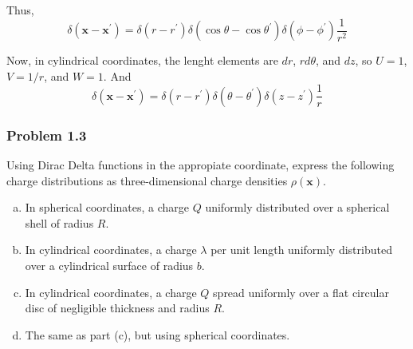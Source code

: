 Thus,
$$
\delta\left(\mathbf{x}-\mathbf{x}^\prime\right) =
\delta(r-r^\prime) \delta(\cos\theta-\cos\theta^\prime) \delta(\phi-\phi^\prime) \frac{1}{r^2}
$$

Now, in cylindrical coordinates, the lenght elements are $dr$, $rd\theta$, and $dz$, so
$U=1$, $V=1/r$, and $W=1$.
And
$$
\delta\left(\mathbf{x}-\mathbf{x}^\prime\right) =
\delta(r-r^\prime) \delta(\theta-\theta^\prime) \delta(z-z^\prime) \frac{1}{r}
$$


\subsubsection{Problem 1.3}

Using Dirac Delta functions in the appropiate coordinate, express the following charge distributions as three-dimensional
charge densities $\rho(\mathbf{x})$.

\begin{enumerate}[(a)]
\item In spherical coordinates, a charge $Q$ uniformly distributed over a spherical shell of radius $R$.

\item In cylindrical coordinates, a charge $\lambda$ per unit length uniformly distributed over a cylindrical
surface of radius $b$.

\item In cylindrical coordinates, a charge $Q$ spread uniformly over a flat circular disc of negligible thickness and radius $R$.

\item The same as part (c), but using spherical coordinates.
\end{enumerate}